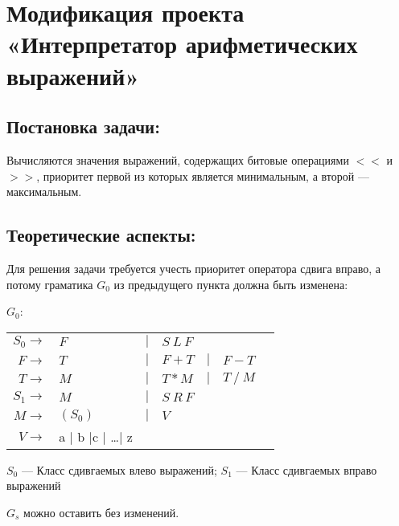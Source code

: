 \section{Модификация проекта «Интерпретатор арифметических выражений»}

\subsection{Постановка задачи:}
Вычисляются значения выражений, содержащих битовые операциями  $<<$ и $>>$,
приоритет первой из которых является минимальным, а второй — максимальным.

\subsection{Теоретические аспекты:}
Для решения задачи требуется учесть приоритет оператора сдвига вправо, а потому
граматика $G_0$ из предыдущего пункта должна быть изменена:

$G_0$:
\medskip
\noindent\hspace{2cm}
\begin{tabular}{rllllll}
$S_0 \rightarrow$ & $F $&$\mid$&$ S~L~F$\\
$F \rightarrow$ & $T $&$\mid$&$ F+T$&$\mid$&$ F-T$\\
$T \rightarrow$ & $M $&$\mid$&$ T*M$&$\mid$&$ T~/~M$\\
$S_1 \rightarrow$ & $M $&$\mid$&$ S~R~F$\\
$M \rightarrow$ & $(S_0)$&$\mid$&$ V$\\
$V \rightarrow$ & a $\mid$ b $\mid$c $\mid$ \dots $\mid$ z\\
\end{tabular}
\medskip

$S_0$ --- Класс сдивгаемых влево выражений;
$S_1$ --- Класс сдивгаемых вправо выражений

$G_s$ можно оставить без изменений.

